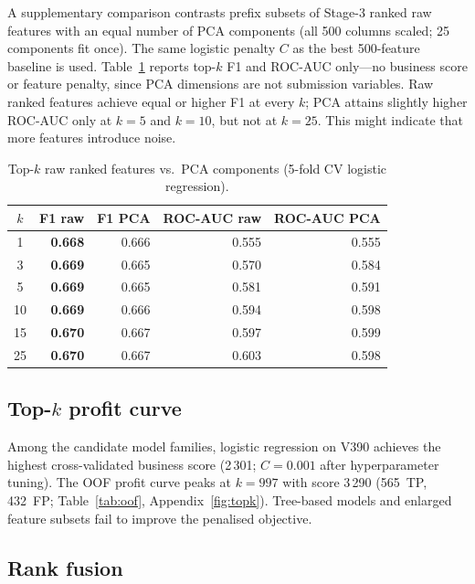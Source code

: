 \documentclass[cameraready]{Interspeech}
\begin{document}
A supplementary comparison contrasts prefix subsets of Stage-3 ranked raw features with an equal number of PCA components (all 500 columns scaled; 25 components fit once).
The same logistic penalty $C$ as the best 500-feature baseline is used.
Table~\ref{tab:pca_raw} reports top-$k$ F1 and ROC-AUC only---no business score or feature penalty, since PCA dimensions are not submission variables.
Raw ranked features achieve equal or higher F1 at every $k$; PCA attains slightly higher ROC-AUC only at $k{=}5$ and $k{=}10$, but not at $k{=}25$.
This might indicate that more features introduce noise.

\begin{table}[t]
    \centering
    \caption{Top-$k$ raw ranked features vs.\ PCA components (5-fold CV logistic regression).}
    \label{tab:pca_raw}
    \footnotesize
    \setlength{\tabcolsep}{4pt}
    \begin{tabular}{crrrr}
        \toprule
        $k$ & F1 raw & F1 PCA & ROC-AUC raw & ROC-AUC PCA \\
        \midrule
        1  & \textbf{0.668} & 0.666 & 0.555 & 0.555 \\
        3  & \textbf{0.669} & 0.665 & 0.570 & 0.584 \\
        5  & \textbf{0.669} & 0.665 & 0.581 & 0.591 \\
        10 & \textbf{0.669} & 0.666 & 0.594 & 0.598 \\
        15 & \textbf{0.670} & 0.667 & 0.597 & 0.599 \\
        25 & \textbf{0.670} & 0.667 & 0.603 & 0.598 \\
        \bottomrule
    \end{tabular}
\end{table}

\subsection{Top-$k$ profit curve}
\label{res:topk}

Among the candidate model families, logistic regression on V390 achieves the highest cross-validated business score (2\,301; $C{=}0.001$ after hyperparameter tuning).
The OOF profit curve peaks at $k{=}997$ with score 3\,290 (565~TP, 432~FP; Table~\ref{tab:oof}, Appendix~\ref{fig:topk}).
Tree-based models and enlarged feature subsets fail to improve the penalised objective.


\subsection{Rank fusion}
\label{res:fusion}
\end{document}
